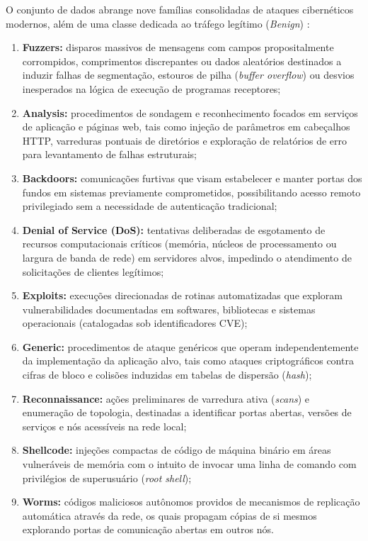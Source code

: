 O conjunto de dados abrange nove famílias consolidadas de ataques cibernéticos modernos, além de uma classe dedicada ao tráfego legítimo (\emph{Benign}) \cite{moustafa2015unsw, standard2021}:
\begin{enumerate}
    \item \textbf{Fuzzers:} disparos massivos de mensagens com campos propositalmente corrompidos, comprimentos discrepantes ou dados aleatórios destinados a induzir falhas de segmentação, estouros de pilha (\emph{buffer overflow}) ou desvios inesperados na lógica de execução de programas receptores;
    \item \textbf{Analysis:} procedimentos de sondagem e reconhecimento focados em serviços de aplicação e páginas web, tais como injeção de parâmetros em cabeçalhos HTTP, varreduras pontuais de diretórios e exploração de relatórios de erro para levantamento de falhas estruturais;
    \item \textbf{Backdoors:} comunicações furtivas que visam estabelecer e manter portas dos fundos em sistemas previamente comprometidos, possibilitando acesso remoto privilegiado sem a necessidade de autenticação tradicional;
    \item \textbf{Denial of Service (DoS):} tentativas deliberadas de esgotamento de recursos computacionais críticos (memória, núcleos de processamento ou largura de banda de rede) em servidores alvos, impedindo o atendimento de solicitações de clientes legítimos;
    \item \textbf{Exploits:} execuções direcionadas de rotinas automatizadas que exploram vulnerabilidades documentadas em softwares, bibliotecas e sistemas operacionais (catalogadas sob identificadores CVE);
    \item \textbf{Generic:} procedimentos de ataque genéricos que operam independentemente da implementação da aplicação alvo, tais como ataques criptográficos contra cifras de bloco e colisões induzidas em tabelas de dispersão (\emph{hash});
    \item \textbf{Reconnaissance:} ações preliminares de varredura ativa (\emph{scans}) e enumeração de topologia, destinadas a identificar portas abertas, versões de serviços e nós acessíveis na rede local;
    \item \textbf{Shellcode:} injeções compactas de código de máquina binário em áreas vulneráveis de memória com o intuito de invocar uma linha de comando com privilégios de superusuário (\emph{root shell});
    \item \textbf{Worms:} códigos maliciosos autônomos providos de mecanismos de replicação automática através da rede, os quais propagam cópias de si mesmos explorando portas de comunicação abertas em outros nós.
\end{enumerate}


